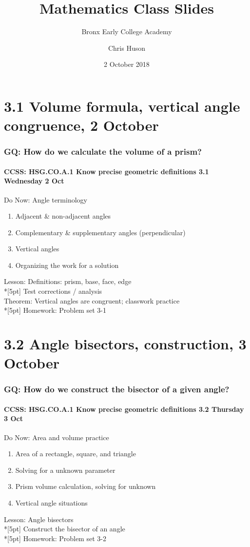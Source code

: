 \documentclass{beamer}
\title{Mathematics Class Slides}
\subtitle{Bronx Early College Academy}
\author{Chris Huson}
\date{2 October 2018}
\begin{document}
\frame{\titlepage}
\section[Outline]{}
\frame{\tableofcontents}

\section{3.1 Volume formula, vertical angle congruence, 2 October}
  \frame
  {
    \frametitle{GQ: How do we calculate the volume of a prism?}
    \framesubtitle{CCSS: HSG.CO.A.1 Know precise geometric definitions \hfill \alert{3.1 Wednesday 2 Oct}}

    \begin{block}{Do Now: Angle terminology}
    \begin{enumerate}
      \item Adjacent \& non-adjacent angles
      \item Complementary \& supplementary angles (perpendicular)
      \item Vertical angles
      \item Organizing the work for a solution
    \end{enumerate}
    \end{block}
    Lesson: Definitions: prism, base, face, edge  \\*[5pt]
    Test corrections / analysis\\
    Theorem: Vertical angles are congruent; classwork practice\\*[5pt]
    Homework: Problem set 3-1 
  }

  \section{3.2 Angle bisectors, construction, 3 October}
    \frame
    {
      \frametitle{GQ: How do we construct the bisector of a given angle?}
      \framesubtitle{CCSS: HSG.CO.A.1 Know precise geometric definitions \hfill \alert{3.2 Thursday 3 Oct}}

      \begin{block}{Do Now: Area and volume practice}
      \begin{enumerate}
        \item Area of a rectangle, square, and triangle
        \item Solving for a unknown parameter
        \item Prism volume calculation, solving for unknown
        \item Vertical angle situations
      \end{enumerate}
      \end{block}
      Lesson: Angle bisectors  \\*[5pt]
      Construct the bisector of an angle\\*[5pt]
      Homework: Problem set 3-2
    }
\end{document}
